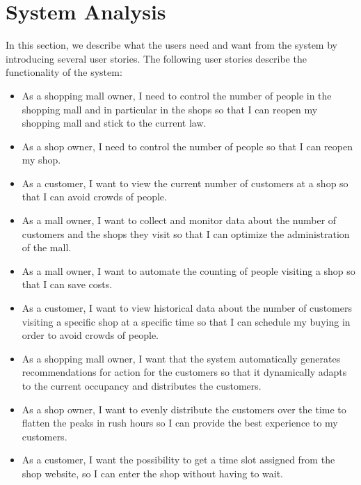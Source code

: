 \documentclass[runningheads]{llncs}
\begin{document}
\section{System Analysis}
In this section, we describe what the users need and want from the system by introducing several user stories. The following user stories describe the functionality of the system:
\begin{itemize}
    \item As a shopping mall owner, I need to control the number of people in the shopping mall and in particular in the shops so that I can reopen my shopping mall and stick to the current law.
    \item As a shop owner, I need to control the number of people so that I can reopen my shop.
    \item As a customer, I want to view the current number of customers at a shop so that I can avoid crowds of people.
    \item As a mall owner, I want to collect and monitor data about the number of customers and the shops they visit so that I can optimize the administration of the mall.
    \item As a mall owner, I want to automate the counting of people visiting a shop so that I can save costs.
    \item As a customer, I want to view historical data about the number of customers visiting a specific shop at a specific time so that I can schedule my buying in order to avoid crowds of people.
    \item As a shopping mall owner, I want that the system automatically generates recommendations for action for the customers so that it dynamically adapts to the current occupancy and distributes the customers.
    \item As a shop owner, I want to evenly distribute the customers over the time to flatten the peaks in rush hours so I can provide the best experience to my customers.
    \item As a customer, I want the possibility to get a time slot assigned from the shop website, so I can enter the shop without having to wait.
\end{itemize}
\end{document}
